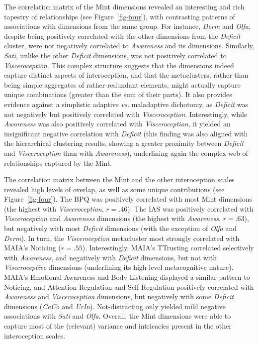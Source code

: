 \documentclass[
  jou,
  floatsintext,
  longtable,
  nolmodern,
  notxfonts,
  notimes,
  colorlinks=true,linkcolor=blue,citecolor=blue,urlcolor=blue]{apa7}
\begin{document}
The correlation matrix of the Mint dimensions revealed an interesting
and rich tapestry of relationships (see Figure~\ref{fig-four}), with
contrasting patterns of associations with dimensions from the same
group. For instance, \emph{Derm} and \emph{Olfa}, despite being
positively correlated with the other dimensions from the \emph{Deficit}
cluster, were not negatively correlated to \emph{Awareness} and its
dimensions. Similarly, \emph{Sati}, unlike the other \emph{Deficit}
dimensions, was not positively correlated to \emph{Visceroception}. This
complex structure suggests that the dimensions indeed capture distinct
aspects of interoception, and that the metaclusters, rather than being
simple aggregates of rather-redundant elements, might actually capture
unique combinations (greater than the sum of their parts). It also
provides evidence against a simplistic adaptive \emph{vs.} maladaptive
dichotomy, as \emph{Deficit} was not negatively but positively
correlated with \emph{Visceroception}. Interestingly, while
\emph{Awareness} was also positively correlated with
\emph{Visceroception}, it yielded an insignificant negative correlation
with \emph{Deficit} (this finding was also aligned with the hierarchical
clustering results, showing a greater proximity between \emph{Deficit}
and \emph{Visceroception} than with \emph{Awareness}), underlining again
the complex web of relationships captured by the Mint.

The correlation matrix between the Mint and the other interoception
scales revealed high levels of overlap, as well as some unique
contributions (see Figure~\ref{fig-four}). The BPQ was positively
correlated with most Mint dimensions (the highest with
\emph{Visceroception}, \(r = .46\)). The IAS was positively correlated
with \emph{Visceroception} and \emph{Awareness} dimensions (the highest
with \emph{Awareness}, \(r = .63\)), but negatively with most
\emph{Deficit} dimensions (with the exception of \emph{Olfa} and
\emph{Derm}). In turn, the \emph{Visceroception} metacluster most
strongly correlated with MAIA's Noticing (\(r = .55\)). Interestingly,
MAIA's TTrusting correlated selectively with \emph{Awareness}, and
negatively with \emph{Deficit} dimensions, but not with
\emph{Visceroceptive} dimensions (underlining its high-level
metacognitive nature). MAIA's Emotional Awareness and Body Listening
displayed a similar pattern to Noticing, and Attention Regulation and
Self Regulation positively correlated with \emph{Awareness} and
\emph{Visceroception} dimensions, but negatively with some
\emph{Deficit} dimensions (\emph{CaCo} and \emph{UrIn}). Not-distracting
only yielded mild negative associations with \emph{Sati} and
\emph{Olfa}. Overall, the Mint dimensions were able to capture most of
the (relevant) variance and intricacies present in the other
interoception scales.
\end{document}
